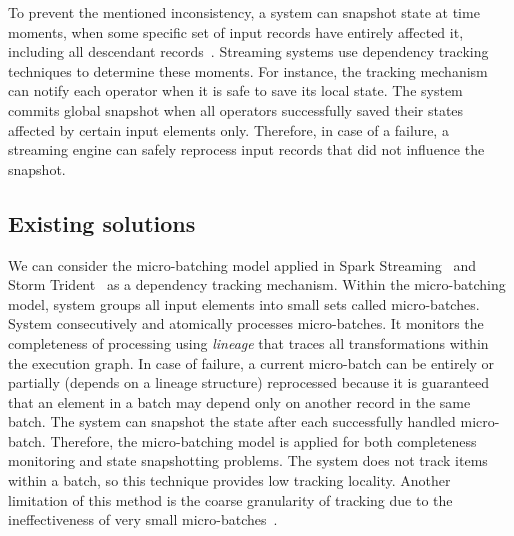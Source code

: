 To prevent the mentioned inconsistency, a system can snapshot state at time moments, when some specific set of input records have entirely affected it, including all descendant records~\cite{2015arXiv150608603C, thepaper}. Streaming systems use dependency tracking techniques to determine these moments. For instance, the tracking mechanism can notify each operator when it is safe to save its local state. The system commits global snapshot when all operators successfully saved their states affected by certain input elements only. Therefore, in case of a failure, a streaming engine can safely reprocess input records that did not influence the snapshot.

\subsection{Existing solutions}
We can consider the micro-batching model applied in Spark Streaming~\cite{Zaharia:2012:DSE:2342763.2342773} and Storm Trident~\cite{apache:storm:trident} as a dependency tracking mechanism. Within the micro-batching model, system groups all input elements into small sets called micro-batches. System consecutively and atomically processes micro-batches. It monitors the completeness of processing using {\em lineage} that traces all transformations within the execution graph. In case of failure, a current micro-batch can be entirely or partially (depends on a lineage structure) reprocessed because it is guaranteed that an element in a batch may depend only on another record in the same batch. The system can snapshot the state after each successfully handled micro-batch. Therefore, the micro-batching model is applied for both completeness monitoring and state snapshotting problems. The system does not track items within a batch, so this technique provides low tracking locality. Another limitation of this method is the coarse granularity of tracking due to the ineffectiveness of very small micro-batches~\cite{Zaharia:2012:DSE:2342763.2342773}.

